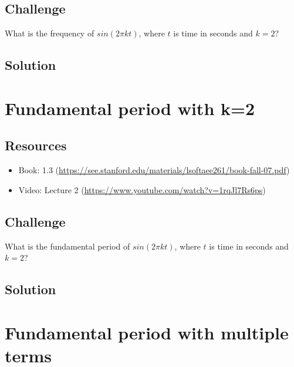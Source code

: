 \subsection*{Challenge}
What is the frequency of $sin(2 \pi k t)$, where $t$ is time in seconds and $k=2$?

\subsection*{Solution}


\timebox




\newpage

\section{Fundamental period with k=2}

\subsection*{Resources}
\begin{itemize}
    \item Book: 1.3 (\url{https://see.stanford.edu/materials/lsoftaee261/book-fall-07.pdf})
    \item Video: Lecture 2 (\url{https://www.youtube.com/watch?v=1rqJl7Rs6ps})
\end{itemize}

\subsection*{Challenge}
What is the fundamental period of $sin(2 \pi k t)$, where $t$ is time in seconds and $k=2$?

\subsection*{Solution}


\timebox




\newpage

\section{Fundamental period with multiple terms}

